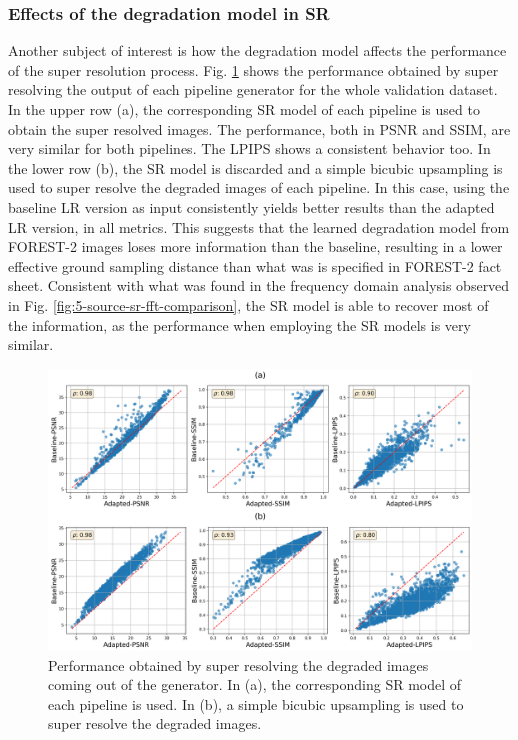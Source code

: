         \subsubsection{Effects of the degradation model in SR}

        Another subject of interest is how the degradation model affects the performance of the super resolution process.
        Fig. \ref{fig:5-source-domain-comparison} shows the performance obtained by super resolving the output of each pipeline generator for the whole validation dataset.
        In the upper row (a), the corresponding SR model of each pipeline is used to obtain the super resolved images. 
        The performance, both in PSNR and SSIM, are very similar for both pipelines. The LPIPS shows a consistent behavior too.
        In the lower row (b), the SR model is discarded and a simple bicubic upsampling is used to super resolve the degraded images of each pipeline. 
        In this case, using the baseline LR version as input consistently yields better results than the adapted LR version, in all metrics.
        This suggests that the learned degradation model from FOREST-2 images loses more information than the baseline, resulting in a lower effective ground sampling distance than what was is specified in FOREST-2 fact sheet.
        Consistent with what was found in the frequency domain analysis observed in Fig. \ref{fig:5-source-sr-fft-comparison}, the SR model is able to recover most of the information, as the performance when employing the SR models is very similar. 
        
        \begin{figure}[H]
            \centering
            \includegraphics[width=\textwidth]{Includes/5-source-domain-comparison.png}
            \caption{Performance obtained by super resolving the degraded images coming out of the generator. 
                     In (a), the corresponding SR model of each pipeline is used. 
                     In (b), a simple bicubic upsampling is used to super resolve the degraded images. }
            \label{fig:5-source-domain-comparison}
        \end{figure}

